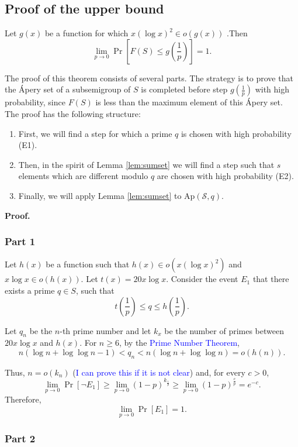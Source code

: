 \subsection{Proof of the upper bound} 
\begin{lemma}\label{lem:upperbound}
    Let $g(x)$ be a function for which $x(\log x)^2 \in o(g(x))$ .Then
    \[\lim_{p \to 0}\Pr\left[F(S) \leq g\left(\frac{1}{p}\right)\right] = 1.\] 
\end{lemma}

\par The proof of this theorem consists of several parts. The strategy is to prove that the Ápery set of a subsemigroup of $S$ is completed before step $g\left(\frac{1}{p}\right)$ with high probability, since $F(S)$ is less than the maximum element of this Ápery set. The proof has the following structure: 
\begin{enumerate}
\item First, we will find a step for which a prime $q$ is chosen with high probability (E1). 
\item Then, in the spirit of Lemma \ref{lem:sumset} we will find a step such that $s$ elements which are different modulo $q$ are chosen with high probability (E2). 
\item Finally, we will apply Lemma \ref{lem:sumset} to $\mathrm{Ap}(\mathcal{S}, q)$.
\end{enumerate}
\textbf{Proof. }
\subsubsection*{Part 1}
Let \(h(x)\) be a function such that \(h(x) \in o(x (\log x)^2)\) and \(x\log x \in o(h(x))\). Let $t(x) = 20x \log x$. Consider the event
$E_1$ that there exists a prime $q \in S$, such that 
\[t\left(\frac{1}{p}\right) \leq q \leq h\left(\frac{1}{p}\right).\]
\par 
Let $q_n$ be the $n$-th prime number and let $k_x$ be the number of primes between $20x\log x$ and $h(x)$. For $n \geq 6$, by the \textcolor{blue}{Prime Number Theorem}, 
\[n(\log n + \log \log n - 1) < q_n < n(\log n + \log\log n) = o(h(n)).\]

\par Thus, $n = o(k_n)$ (\textcolor{blue}{I can prove this if it is not clear}) and, for every $c > 0$,  
\[\lim_{p \to 0}\Pr[\lnot E_1] \geq \lim_{p \to 0} (1 - p)^{k_{\frac{1}{p}}} \geq \lim_{p \to 0} (1 - p)^{\frac{c}{p}} = e^{-c}.\]
Therefore, 
\[\lim_{p \to 0}\Pr[E_1] = 1.\]
\subsubsection*{Part 2}

